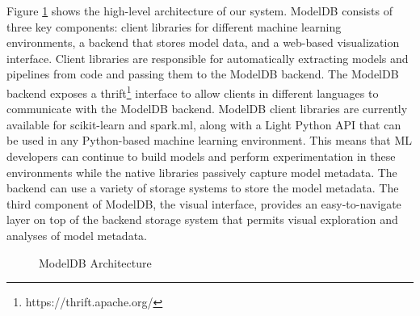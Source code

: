 \documentclass[11pt]{article}
\newcommand{\mpv}[1]{\textcolor{blue}{mpv: #1}}
\newcommand{\mdb}{{\sc ModelDB}\xspace}
\newcommand{\mldevs}{ML developers\xspace}
\begin{document}
Figure \ref{fig:mdb_arch} shows the high-level architecture of our system. 
\mdb consists of three key components: client libraries for different machine learning environments, a backend that stores
model data, and a web-based visualization interface. 
Client libraries are responsible for automatically extracting models and pipelines from code
and passing them to the \mdb backend. 
The \mdb backend exposes a thrift\footnote{https://thrift.apache.org/} 
interface to allow clients in different 
languages to communicate with the \mdb backend.
\mdb client libraries are currently available for scikit-learn and spark.ml, along with a Light Python API that can be used in any Python-based machine learning environment.
This means that \mldevs can continue to build models and perform 
experimentation in these environments while the native libraries
passively capture model metadata.
The backend can use a variety of storage systems to store the model metadata.
The third component of \mdb, the visual interface, provides an easy-to-navigate layer on top of the backend storage system that permits visual exploration and analyses of model metadata.

\begin{figure}[tb] 
\centerline{
\hbox{}}
\caption{ModelDB Architecture}
\label{fig:mdb_arch}
\end{figure}
\end{document}
